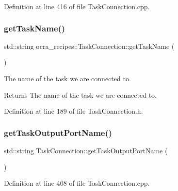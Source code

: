 Definition at line 416 of file Task\+Connection.\+cpp.

\hypertarget{classocra__recipes_1_1TaskConnection_ad33b58e0bf6e0f7051b0187435b014f9}{}\label{classocra__recipes_1_1TaskConnection_ad33b58e0bf6e0f7051b0187435b014f9} 
\subsubsection{\texorpdfstring{get\+Task\+Name()}{getTaskName()}}
{\footnotesize\ttfamily std\+::string ocra\+\_\+recipes\+::\+Task\+Connection\+::get\+Task\+Name (\begin{DoxyParamCaption}{ }\end{DoxyParamCaption})\hspace{0.3cm}{\ttfamily [inline]}}

The name of the task we are connected to.

\begin{DoxyReturn}{Returns}
The name of the task we are connected to. 
\end{DoxyReturn}


Definition at line 189 of file Task\+Connection.\+h.

\hypertarget{classocra__recipes_1_1TaskConnection_add06cf3474cdf145340850854c67ccd1}{}\label{classocra__recipes_1_1TaskConnection_add06cf3474cdf145340850854c67ccd1} 
\subsubsection{\texorpdfstring{get\+Task\+Output\+Port\+Name()}{getTaskOutputPortName()}}
{\footnotesize\ttfamily std\+::string Task\+Connection\+::get\+Task\+Output\+Port\+Name (\begin{DoxyParamCaption}{ }\end{DoxyParamCaption})}



Definition at line 408 of file Task\+Connection.\+cpp.

\hypertarget{classocra__recipes_1_1TaskConnection_ae85f5279d0fe6b8c63ee9736f6308583}{}\label{classocra__recipes_1_1TaskConnection_ae85f5279d0fe6b8c63ee9736f6308583} 
